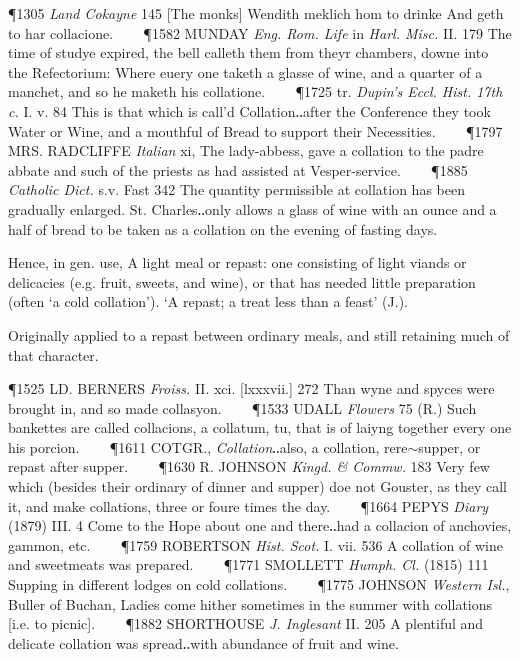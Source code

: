 \begin{description}[wide, labelwidth=!, labelindent=0pt]
\begin{myenumerate}
\P 1305 \textit{Land  Cokayne} 145 [The monks] Wendith meklich hom to drinke And geth to har collacione.    
\P 1582 MUNDAY  \textit{Eng. Rom. Life} in \textit{Harl. Misc.} II. 179 The time of studye expired, the bell calleth them from theyr chambers, downe into the Refectorium: Where euery one taketh a glasse of wine, and a quarter of a manchet, and so he maketh his collatione.    
\P 1725 tr. \textit{Dupin's Eccl. Hist. 17th c.} I. v. 84 This is that which is call'd Collation‥after the Conference they took Water or Wine, and a mouthful of Bread to support their Necessities.    
\P 1797 MRS. RADCLIFFE  \textit{Italian} xi, The lady-abbess, gave a collation to the padre abbate and such of the priests as had assisted at Vesper-service.    
\P 1885 \textit{Catholic  Dict.} s.v. Fast 342 The quantity permissible at collation has been gradually enlarged. St. Charles‥only allows a glass of wine with an ounce and a half of bread to be taken as a collation on the evening of fasting days.

 Hence, in gen. use, A light meal or repast: one consisting of light viands or delicacies (e.g. fruit, sweets, and wine), or that has needed little preparation (often ‘a cold collation’). ‘A repast; a treat less than a feast’ (J.).

Originally applied to a repast between ordinary meals, and still retaining much of that character.

\P 1525 LD. BERNERS  \textit{Froiss.} II. xci. [lxxxvii.] 272 Than wyne and spyces were brought in, and so made collasyon.    
\P 1533 UDALL  \textit{Flowers} 75 (R.) Such bankettes are called collacions, a collatum, tu, that is of laiyng together every one his porcion.    
\P 1611 COTGR.,  \textit{Collation}‥also, a collation, rere$\sim$supper, or repast after supper.    
\P 1630 R. JOHNSON  \textit{Kingd. \& Commw.} 183 Very few which (besides their ordinary of dinner and supper) doe not Gouster, as they call it, and make collations, three or foure times the day.    
\P 1664 PEPYS  \textit{Diary} (1879) III. 4 Come to the Hope about one and there‥had a collacion of anchovies, gammon, etc.    
\P 1759 ROBERTSON  \textit{Hist. Scot.} I. vii. 536 A collation of wine and sweetmeats was prepared.    
\P 1771 SMOLLETT  \textit{Humph. Cl.} (1815) 111 Supping in different lodges on cold collations.    
\P 1775 JOHNSON  \textit{Western Isl.}, Buller of Buchan, Ladies come hither sometimes in the summer with collations [i.e. to picnic].    
\P 1882 SHORTHOUSE \textit{J. Inglesant} II. 205 A plentiful and delicate collation was spread‥with abundance of fruit and wine.


\end{myenumerate}
\end{description}
